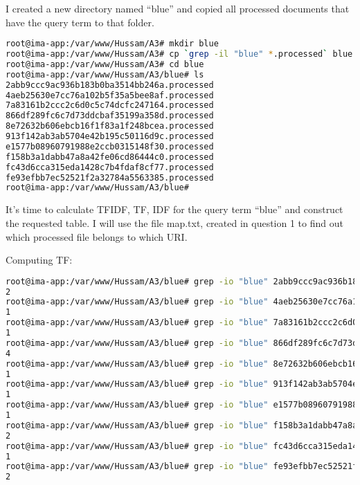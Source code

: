 \documentclass[a4paper, 11pt]{article}
\begin{document}
I created a new directory named ``blue'' and copied all processed documents that have the query term to that folder.

\begin{lstlisting}[language=bash, breakatwhitespace=〈false), label=copy docs, caption= Copying the documents containing the query term to a separate folder]
root@ima-app:/var/www/Hussam/A3# mkdir blue
root@ima-app:/var/www/Hussam/A3# cp `grep -il "blue" *.processed` blue
root@ima-app:/var/www/Hussam/A3# cd blue
root@ima-app:/var/www/Hussam/A3/blue# ls
2abb9ccc9ac936b183b0ba3514bb246a.processed
4aeb25630e7cc76a102b5f35a5bee8af.processed
7a83161b2ccc2c6d0c5c74dcfc247164.processed
866df289fc6c7d73ddcbaf35199a358d.processed
8e72632b606ebcb16f1f83a1f248bcea.processed
913f142ab3ab5704e42b195c50116d9c.processed
e1577b08960791988e2ccb0315148f30.processed
f158b3a1dabb47a8a42fe06cd86444c0.processed
fc43d6cca315eda1428c7b4fdaf8cf77.processed
fe93efbb7ec52521f2a32784a5563385.processed
root@ima-app:/var/www/Hussam/A3/blue#
\end{lstlisting}

It's time to calculate TFIDF, TF, IDF for the query term ``blue'' and construct the requested table. I will use the file map.txt, created in question 1 to find out which processed file belongs to which URI.

Computing TF:

\begin{lstlisting}[language=bash, breakatwhitespace=〈false), label=Computing TF, caption= Computing TF:]
root@ima-app:/var/www/Hussam/A3/blue# grep -io "blue" 2abb9ccc9ac936b183b0ba3514bb246a.processed | wc -w
2
root@ima-app:/var/www/Hussam/A3/blue# grep -io "blue" 4aeb25630e7cc76a102b5f35a5bee8af.processed | wc -w
1
root@ima-app:/var/www/Hussam/A3/blue# grep -io "blue" 7a83161b2ccc2c6d0c5c74dcfc247164.processed | wc -w
1
root@ima-app:/var/www/Hussam/A3/blue# grep -io "blue" 866df289fc6c7d73ddcbaf35199a358d.processed | wc -w
4
root@ima-app:/var/www/Hussam/A3/blue# grep -io "blue" 8e72632b606ebcb16f1f83a1f248bcea.processed | wc -w
1
root@ima-app:/var/www/Hussam/A3/blue# grep -io "blue" 913f142ab3ab5704e42b195c50116d9c.processed | wc -w
1
root@ima-app:/var/www/Hussam/A3/blue# grep -io "blue" e1577b08960791988e2ccb0315148f30.processed | wc -w
1
root@ima-app:/var/www/Hussam/A3/blue# grep -io "blue" f158b3a1dabb47a8a42fe06cd86444c0.processed | wc -w
2
root@ima-app:/var/www/Hussam/A3/blue# grep -io "blue" fc43d6cca315eda1428c7b4fdaf8cf77.processed | wc -w
1
root@ima-app:/var/www/Hussam/A3/blue# grep -io "blue" fe93efbb7ec52521f2a32784a5563385.processed | wc -w
2
\end{lstlisting}
\end{document}
